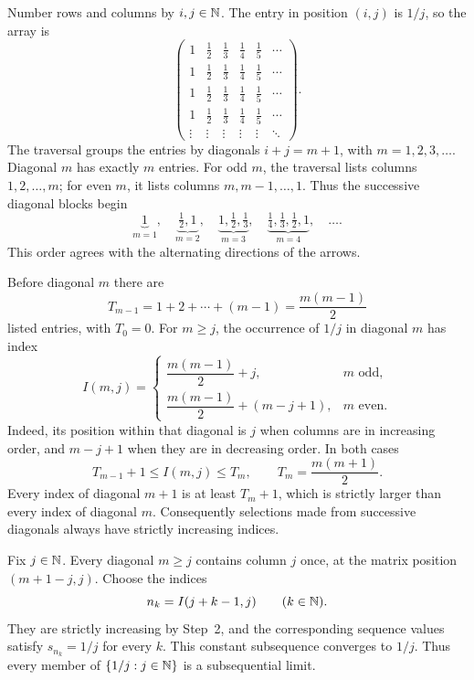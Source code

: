 Number rows and columns by $i,j\in\mathbb{N}$. The entry in position
$(i,j)$ is $1/j$, so the array is
\[
 \begin{pmatrix}
 1&\frac12&\frac13&\frac14&\frac15&\cdots\\
 1&\frac12&\frac13&\frac14&\frac15&\cdots\\
 1&\frac12&\frac13&\frac14&\frac15&\cdots\\
 1&\frac12&\frac13&\frac14&\frac15&\cdots\\
 \vdots&\vdots&\vdots&\vdots&\vdots&\ddots
 \end{pmatrix}.
\]
The traversal groups the entries by diagonals
$i+j=m+1$, with $m=1,2,3,\ldots$.
Diagonal $m$ has exactly $m$ entries.
For odd $m$, the traversal lists columns $1,2,\ldots,m$;
for even $m$, it lists columns $m,m-1,\ldots,1$.
Thus the successive diagonal blocks begin
\[
 \underbrace{1}_{m=1},\quad
 \underbrace{\tfrac12,1}_{m=2},\quad
 \underbrace{1,\tfrac12,\tfrac13}_{m=3},\quad
 \underbrace{\tfrac14,\tfrac13,\tfrac12,1}_{m=4},\quad\ldots.
\]
This order agrees with the alternating directions of the arrows.

Before diagonal $m$ there are
\[
 T_{m-1}=1+2+\cdots+(m-1)=\frac{m(m-1)}2
\]
listed entries, with $T_0=0$.
For $m\ge j$, the occurrence of $1/j$ in diagonal $m$ has index
\[
 I(m,j)=
 \begin{cases}
 \dfrac{m(m-1)}2+j,&m\text{ odd},\\[4pt]
 \dfrac{m(m-1)}2+(m-j+1),&m\text{ even}.
 \end{cases}
\]
Indeed, its position within that diagonal is $j$ when columns are
in increasing order, and $m-j+1$ when they are in decreasing order.
In both cases
\[
 T_{m-1}+1\le I(m,j)\le T_m,
 \qquad T_m=\frac{m(m+1)}2.
\]
Every index of diagonal $m+1$ is at least $T_m+1$, which is
strictly larger than every index of diagonal $m$.
Consequently selections made from successive diagonals always
have strictly increasing indices.

Fix $j\in\mathbb{N}$. Every diagonal $m\ge j$ contains column $j$
once, at the matrix position $(m+1-j,j)$.
Choose the indices
\[
 n_k=I(j+k-1,j)\qquad(k\in\mathbb{N}).
\]
They are strictly increasing by Step~2, and the corresponding
sequence values satisfy $s_{n_k}=1/j$ for every $k$.
This constant subsequence converges to $1/j$.
Thus every member of $\{1/j:j\in\mathbb{N}\}$ is a subsequential limit.

